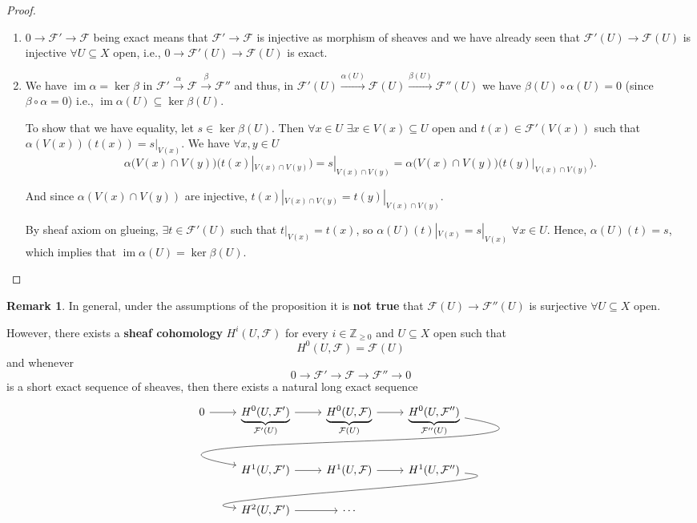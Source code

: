 \documentclass[12pt]{article}
\DeclareMathOperator{\im}{im}
\theoremstyle{definition}
\newtheorem*{remark}{Remark}
\begin{document}
\begin{proof}
\begin{enumerate}[label=\arabic*)]
\item $0\rightarrow\mathcal F'\rightarrow\mathcal F$ being exact means that $\mathcal F'\rightarrow\mathcal F$ is injective as morphism of sheaves and we have already seen that $\mathcal F'(U)\rightarrow\mathcal F(U)$ is injective $\forall U\subseteq X$ open, i.e., $0\rightarrow\mathcal F'(U)\rightarrow\mathcal F(U)$ is exact.

\item We have $\im\alpha=\ker\beta$ in $\mathcal F'\xrightarrow\alpha\mathcal F\xrightarrow\beta\mathcal F''$ and thus, in $\mathcal F'(U)\xrightarrow{\alpha(U)}\mathcal F(U)\xrightarrow{\beta(U)}\mathcal F''(U)$ we have $\beta(U)\circ\alpha(U)=0$ (since $\beta\circ\alpha=0$) i.e., $\im\alpha(U)\subseteq\ker\beta(U)$.

To show that we have equality, let $s\in\ker\beta(U)$. Then $\forall x\in U$ $\exists x\in V(x)\subseteq U$ open and $t(x)\in\mathcal F'(V(x))$ such that $\alpha(V(x))(t(x))=s|_{V(x)}$. We have $\forall x,y\in U$
\[\alpha\big(V(x)\cap V(y)\big)\big(t(x)|_{V(x)\cap V(y)}\big)=s|_{V(x)\cap V(y)}=\alpha\big(V(x)\cap V(y)\big)\big(t(y)|_{V(x)\cap V(y)}\big).\]

And since $\alpha(V(x)\cap V(y))$ are injective, $t(x)|_{V(x)\cap V(y)}=t(y)|_{V(x)\cap V(y)}$.

By sheaf axiom on glueing, $\exists t\in\mathcal F'(U)$ such that $t|_{V(x)}=t(x)$, so $\alpha(U)(t)|_{V(x)}=s|_{V(x)}$ $\forall x\in U$. Hence, $\alpha(U)(t)=s$, which implies that $\im\alpha(U)=\ker\beta(U)$.
\end{enumerate}
\end{proof}

\begin{remark}
In general, under the assumptions of the proposition it is \textbf{not true} that $\mathcal F(U)\rightarrow\mathcal F''(U)$ is surjective $\forall U\subseteq X$ open.

However, there exists a \textbf{sheaf cohomology} $H^i(U,\mathcal F)$ for every $i\in\mathbb Z_{\geq0}$ and $U\subseteq X$ open such that
\[H^0(U,\mathcal F)=\mathcal F(U)\]
and whenever
\[0\longrightarrow\mathcal F'\longrightarrow\mathcal F\longrightarrow\mathcal F''\longrightarrow0\]
is a short exact sequence of sheaves, then there exists a natural long exact sequence
\[\begin{tikzcd}0\arrow[r]&\underbrace{H^0(U,\mathcal F')}_{\mathcal F'(U)}\arrow[r]&\underbrace{H^0(U,\mathcal F)}_{\mathcal F(U)}\arrow[r]&\underbrace{H^0(U,\mathcal F'')}_{\mathcal F''(U)}\arrow[out=350,in=170,looseness=2,lld]\\&H^1(U,\mathcal F')\arrow[r]&H^1(U,\mathcal F)\arrow[r]&H^1(U,\mathcal F'')\arrow[out=355,in=175, looseness=1,overlay,lld]\\&H^2(U,\mathcal F')\arrow[r]&\cdots\end{tikzcd}\]
\end{remark}
\end{document}
